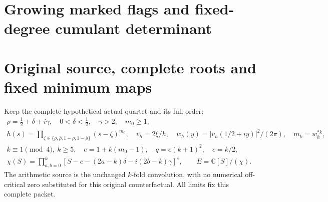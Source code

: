 \endgroup

\clearpage
\begingroup
\def\C{\mathbb C}
\def\R{\mathbb R}
\def\PP{\mathcal P}
\def\Fcal{\mathscr F}
\def\Bcal{\mathcal B}
\def\norm#1{\left\lVert#1\right\rVert}
\def\Tr{\operatorname{Tr}}
\def\im{\operatorname{im}}
\def\Gram{\operatorname{Gram}}
\def\cond{\operatorname{cond}}

\setcounter{equation}{0}
\renewcommand{\theequation}{A02GMF.\arabic{equation}}
\section*{Growing marked flags and fixed-degree cumulant determinant}



\begin{abstract}
For the original arithmetic source and its specified centre-filled
comparison, a linearly growing marked flag has large positive
individual logarithmic volume changes at every original cutoff.
Its balanced four-cutoff return nevertheless has an explicit
exponentially small bound.  The proof estimates every admissible
relation and terminal representative before taking the original
minima; it retains the full terminal--polynomial cross block.
The same estimates give linearly many large generalized
eigenvalues and a complementary subspace forcing all but
\(O_h(q/\log(q/k))\) eigenvalues into an exponentially short
interval about one.  Exact quotient determinant factorization
then carries the complete signed central response into the
attained complement of the marked flag.  The stated complement
is retained as its actual metric quotient.
\end{abstract}

\section{Original source, complete roots and fixed minimum maps}

Keep the complete hypothetical actual quartet and its full order:
\begin{equation}\tag{GMF1}
\begin{gathered}
 \rho=\tfrac12+\delta+i\gamma,\quad
 0<\delta<\tfrac12,\quad \gamma>2,\quad m_0\ge1,\\
 h(s)=\prod_{\zeta\in\{\rho,\bar\rho,1-\rho,1-\bar\rho\}}
                       (s-\zeta)^{m_0},\quad
 v_h=2\xi/h,\quad
 w_h(y)=|v_h(1/2+iy)|^2/(2\pi),\quad m_k=w_h^{*k},\\
 k\equiv1\pmod4,\ k\ge5,\quad
 e=1+k(m_0-1),\quad q=e(k+1)^2,\quad c=k/2,\\
 \chi(S)=\prod_{a,b=0}^k
 [S-c-(2a-k)\delta-i(2b-k)\gamma]^e,\qquad
 E=\C[S]/(\chi).
\end{gathered}
\end{equation}
The arithmetic source is the unchanged \(k\)-fold convolution,
with no numerical off-critical zero substituted for this original
counterfactual.  All limits fix this complete packet.

